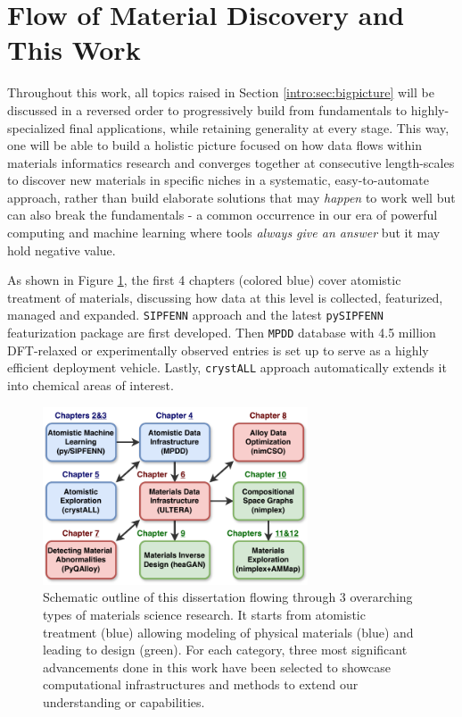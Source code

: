 \section{Flow of Material Discovery and This Work} \label{intro:sec:flow}

Throughout this work, all topics raised in Section \ref{intro:sec:bigpicture} will be discussed in a reversed order to progressively build from fundamentals to highly-specialized final applications, while retaining generality at every stage. This way, one will be able to build a holistic picture focused on how data flows within materials informatics research and converges together at consecutive length-scales to discover new materials in specific niches in a systematic, easy-to-automate approach, rather than build elaborate solutions that may \emph{happen} to work well but can also break the fundamentals - a common occurrence in our era of powerful computing and machine learning where tools \emph{always give an answer} but it may hold negative value.

As shown in Figure \ref{intro:fig:outline}, the first 4 chapters (colored blue) cover atomistic treatment of materials, discussing how data at this level is collected, featurized, managed and expanded. \texttt{SIPFENN} approach and the latest \texttt{pySIPFENN} featurization package are first developed. Then \texttt{MPDD} database with 4.5 million DFT-relaxed or experimentally observed entries is set up to serve as a highly efficient deployment vehicle. Lastly, \texttt{crystALL} approach automatically extends it into chemical areas of interest.

\begin{figure}[H]
    \centering
    \includegraphics[width=0.7\textwidth]{intro/DissertationOutline.pdf}
    \caption{Schematic outline of this dissertation flowing through 3 overarching types of materials science research. It starts from atomistic treatment (blue) allowing modeling of physical materials (blue) and leading to design (green). For each category, three most significant advancements done in this work have been selected to showcase computational infrastructures and methods to extend our understanding or capabilities.}
    \label{intro:fig:outline}
\end{figure}

